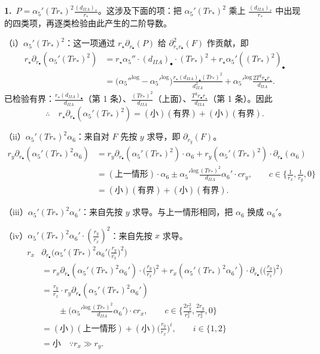 \medskip
\noindent\textbf{1.}\ $P=\alpha_5'(Tr_*)^2\frac{(d_{IIA})_*}{r_*}$。这涉及下面的项：把 $\alpha_5'(Tr_*)^2$ 乘上 $\frac{(d_{IIA})_*}{r_*}$ 中出现的四类项，再逐类检验由此产生的二阶导数。

\medskip
\noindent（i）$\alpha_5'(Tr_*)^2$：这一项通过 $r_\star\partial_{r_\bullet}(P)$ 给 $\partial^2_{r_\star r_\bullet}(F)$ 作贡献，即
\begin{align*}
r_\star\partial_{r_\bullet}(\alpha_5'(Tr_*)^2)
&=r_\star\alpha_5''\cdot(d_{IIA})_\bullet\cdot(Tr_*)^2+r_\star\alpha_5'((Tr_*)^2)_\bullet\\
&=\big({\alpha_5''}^{\log}-{\alpha_5'}^{\log}\big)\frac{r_\star(d_{IIA})_\bullet(Tr_*)^2}{d_{IIA}^2}
+{\alpha_5'}^{\log}\frac{2T^2r_\bullet r_\star}{d_{IIA}}.
\end{align*}
已检验有界：$\frac{r_\star(d_{IIA})_\bullet}{d_{IIA}}$（第 1 条）、$\frac{(Tr_*)^2}{d_{IIA}}$（上面）、$\frac{T^2r_\bullet r_\star}{d_{IIA}}$（第 1 条）。因此
\[
\therefore\quad r_\star\partial_{r_\bullet}(\alpha_5'(Tr_*)^2)=(\text{小})(\text{有界})+(\text{小})(\text{有界}).
\]

\medskip
\noindent（ii）$\alpha_5'(Tr_*)^2\alpha_6$：来自对 $F$ 先按 $y$ 求导，即 $\partial_{r_y}(F)$。
\begin{align*}
r_y\partial_{r_\bullet}(\alpha_5'(Tr_*)^2\alpha_6)
&=r_y\partial_{r_\bullet}(\alpha_5'(Tr_*)^2)\cdot\alpha_6+r_y(\alpha_5'(Tr_*)^2)\cdot\partial_{r_\bullet}(\alpha_6)\\
&=(\text{上一情形})\cdot\alpha_6\pm{\alpha_5'}^{\log}\frac{(Tr_*)^2}{d_{IIA}}\alpha_6'\cdot cr_y,
\qquad c\in\Big\{\frac1{r_x},\frac1{r_y},0\Big\}\\
&=(\text{小})(\text{有界})+(\text{小})(\text{有界}).
\end{align*}

\medskip
\noindent（iii）$\alpha_5'(Tr_*)^2\alpha_6'$：来自先按 $y$ 求导。与上一情形相同，把 $\alpha_6$ 换成 $\alpha_6'$。

\medskip
\noindent（iv）$\alpha_5'(Tr_*)^2\alpha_6'\cdot\left(\frac{r_y}{r_x}\right)^2$：来自先按 $x$ 求导。
\begin{align*}
r_x&\partial_{r_\bullet}\Big(\alpha_5'(Tr_*)^2\alpha_6'\Big(\frac{r_y}{r_x}\Big)^2\Big)\\
&=r_x\partial_{r_\bullet}(\alpha_5'(Tr_*)^2\alpha_6')\cdot\Big(\frac{r_y}{r_x}\Big)^2
+r_x(\alpha_5'(Tr_*)^2\alpha_6')\cdot\partial_{r_\bullet}\Big(\Big(\frac{r_y}{r_x}\Big)^2\Big)\\
&=\frac{r_y}{r_x}\cdot r_y\partial_{r_\bullet}(\alpha_5'(Tr_*)^2\alpha_6')\\
&\qquad\pm\Big({\alpha_5'}^{\log}\frac{(Tr_*)^2}{d_{IIA}}\alpha_6'\Big)\cdot cr_x,
\qquad c\in\Big\{\frac{2r_y^2}{r_x^3},\frac{2r_y}{r_x^2},0\Big\}\\
&=(\text{小})(\text{上一情形})+(\text{小})\Big(\frac{r_y}{r_x}\Big)^i,\qquad i\in\{1,2\}\\
&=\text{小}\quad\because r_x\gg r_y.
\end{align*}

